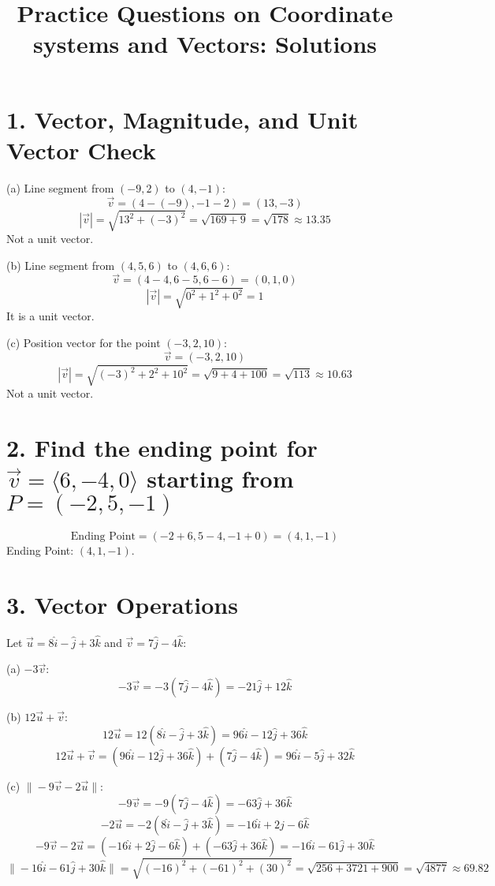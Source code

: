 \documentclass[11pt]{article}
\title{Practice Questions on  Coordinate systems and Vectors: Solutions}
\author{}
\begin{document}
\maketitle
\thispagestyle{fancy}


\section*{1. Vector, Magnitude, and Unit Vector Check}

(a) Line segment from $(-9, 2)$ to $(4, -1)$:
\[
\vec{v} = (4 - (-9), -1 - 2) = (13, -3)
\]
\[
|\vec{v}| = \sqrt{13^2 + (-3)^2} = \sqrt{169 + 9} = \sqrt{178} \approx 13.35
\]
Not a unit vector.

(b) Line segment from $(4, 5, 6)$ to $(4, 6, 6)$:
\[
\vec{v} = (4 - 4, 6 - 5, 6 - 6) = (0, 1, 0)
\]
\[
|\vec{v}| = \sqrt{0^2 + 1^2 + 0^2} = 1
\]
It is a unit vector.

(c) Position vector for the point $(-3, 2, 10)$:
\[
\vec{v} = (-3, 2, 10)
\]
\[
|\vec{v}| = \sqrt{(-3)^2 + 2^2 + 10^2} = \sqrt{9 + 4 + 100} = \sqrt{113} \approx 10.63
\]
Not a unit vector.

\section*{2. Find the ending point for $\vec{v} = \langle 6, -4, 0 \rangle$ starting from $P = (-2, 5, -1)$}
\[
\text{Ending Point} = (-2 + 6, 5 - 4, -1 + 0) = (4, 1, -1)
\]
Ending Point: $(4, 1, -1)$.

\section*{3. Vector Operations}

Let $\vec{u} = 8\hat{i} - \hat{j} + 3\hat{k}$ and $\vec{v} = 7\hat{j} - 4\hat{k}$:

(a) $-3\vec{v}$:
\[
-3\vec{v} = -3(7\hat{j} - 4\hat{k}) = -21\hat{j} + 12\hat{k}
\]

(b) $12\vec{u} + \vec{v}$:
\[
12\vec{u} = 12(8\hat{i} - \hat{j} + 3\hat{k}) = 96\hat{i} - 12\hat{j} + 36\hat{k}
\]
\[
12\vec{u} + \vec{v} = (96\hat{i} - 12\hat{j} + 36\hat{k}) + (7\hat{j} - 4\hat{k}) = 96\hat{i} - 5\hat{j} + 32\hat{k}
\]

(c) $\| -9\vec{v} - 2\vec{u} \|$:
\[
-9\vec{v} = -9(7\hat{j} - 4\hat{k}) = -63\hat{j} + 36\hat{k}
\]
\[
-2\vec{u} = -2(8\hat{i} - \hat{j} + 3\hat{k}) = -16\hat{i} + 2\hat{j} - 6\hat{k}
\]
\[
-9\vec{v} - 2\vec{u} = (-16\hat{i} + 2\hat{j} - 6\hat{k}) + (-63\hat{j} + 36\hat{k}) = -16\hat{i} - 61\hat{j} + 30\hat{k}
\]
\[
\| -16\hat{i} - 61\hat{j} + 30\hat{k} \| = \sqrt{(-16)^2 + (-61)^2 + (30)^2} = \sqrt{256 + 3721 + 900} = \sqrt{4877} \approx 69.82
\]
\end{document}
